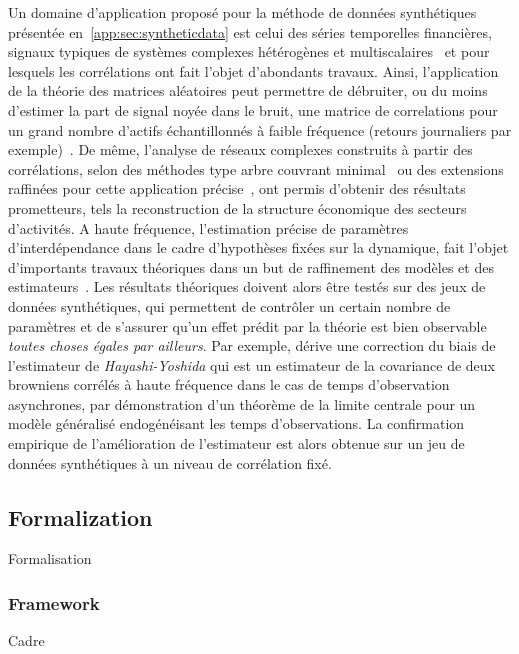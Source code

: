 {Un domaine d'application proposé pour la méthode de données synthétiques présentée en~\ref{app:sec:syntheticdata} est celui des séries temporelles financières, signaux typiques de systèmes complexes hétérogènes et multiscalaires~\cite{mantegna2000introduction} et pour lesquels les corrélations ont fait l'objet d'abondants travaux. Ainsi, l'application de la théorie des matrices aléatoires peut permettre de débruiter, ou du moins d'estimer la part de signal noyée dans le bruit, une matrice de correlations pour un grand nombre d'actifs échantillonnés à faible fréquence (retours journaliers par exemple)~\cite{2009arXiv0910.1205B}. De même, l'analyse de réseaux complexes construits à partir des corrélations, selon des méthodes type arbre couvrant minimal~\cite{2001PhyA..299...16B} ou des extensions raffinées pour cette application précise~\cite{tumminello2005tool}, ont permis d'obtenir des résultats prometteurs, tels la reconstruction de la structure économique des secteurs d'activités. A haute fréquence, l'estimation précise de paramètres d'interdépendance dans le cadre d'hypothèses fixées sur la dynamique, fait l'objet d'importants travaux théoriques dans un but de raffinement des modèles et des estimateurs~\cite{barndorff2011multivariate}. Les résultats théoriques doivent alors être testés sur des jeux de données synthétiques, qui permettent de contrôler un certain nombre de paramètres et de s'assurer qu'un effet prédit par la théorie est bien observable \emph{toutes choses égales par ailleurs}. Par exemple, \cite{potiron2015estimation} dérive une correction du biais de l'estimateur de \emph{Hayashi-Yoshida} qui est un estimateur de la covariance de deux browniens corrélés à haute fréquence dans le cas de temps d'observation asynchrones, par démonstration d'un théorème de la limite centrale pour un modèle généralisé endogénéisant les temps d'observations. La confirmation empirique de l'amélioration de l'estimateur est alors obtenue sur un jeu de données synthétiques à un niveau de corrélation fixé.
}


\subsection*{Formalization}{Formalisation}

\subsubsection*{Framework}{Cadre}



